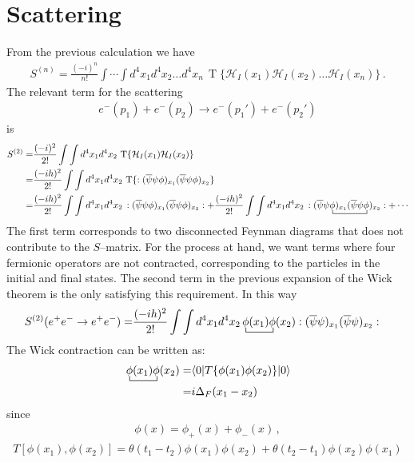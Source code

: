\section{Scattering}
\label{sec:scattering}
From the previous calculation we have
\begin{align}
S^{(n)}=  \frac{(-i)^n}{n!}\int\cdots\int d^4x_1 d^4x_2\ldots d^4x_n\,\operatorname{T}\{\mathcal{H}_I(x_1)\mathcal{H}_I(x_2)\ldots\mathcal{H}_I(x_n)\}\,.
\end{align}
The relevant term for the scattering
\begin{align}
  e^{-}(p_1)+e^{-}(p_2)\to   e^{-}(p_1')+e^{-}(p_2')
\end{align}
is
\begin{align}
S^{(2)}=&  \frac{(-i)^2}{2!}\int\int d^4x_1 d^4x_2\,\operatorname{T}\{\mathcal{H}_I(x_1)\mathcal{H}_I(x_2)\}\nonumber\\
=&  \frac{(-ih)^2}{2!}\int\int d^4x_1 d^4x_2\,\operatorname{T}\{:(\overline{\psi}\psi\phi)_{x_1}(\overline{\psi}\psi\phi)_{x_2}\}\nonumber\\
=& 
 \frac{(-ih)^2}{2!}\int\int d^4x_1 d^4x_2\,:(\overline{\psi}\psi\phi)_{x_1}(\overline{\psi}\psi\phi
)_{x_2}:+
 \frac{(-ih)^2}{2!}\int\int d^4x_1 d^4x_2\,:(\overline{\psi}
\bcontraction{\psi}{\phi}{)_{x_1}(\overline{\psi}\psi}{\phi}
\psi\phi)_{x_1}(\overline{\psi}\psi\phi
)_{x_2}:+\cdots
\end{align}
The first term corresponds to two  disconnected Feynman diagrams that does not contribute to the $S$--matrix. For the process at hand, we want terms where four fermionic operators are not contracted, corresponding to the particles in the initial and final states. The second term in the previous expansion of the Wick theorem is the only satisfying this requirement. In this way
\begin{align}
  S^{(2)}(e^+ e^-\to e^+e^-)=&\frac{(-ih)^2}{2!}\int\int d^4x_1 d^4x_2
\bcontraction{\,}{\phi}{(x_1)}{\phi}
\,\phi(x_1)\phi(x_2):(\overline{\psi}\psi)_{x_1}(\overline{\psi}\psi)_{x_2}:
\end{align}
The Wick contraction can be written as:
\begin{align}
\label{eq:77f}
  \bcontraction{\,}{\phi}{(x_1)}{\phi}
\,\phi(x_1)\phi(x_2)=&\langle0|T\{\phi(x_1)\phi(x_2)\}|0\rangle\nonumber\\
=&i\Delta_F(x_1-x_2)
\end{align}
since
\begin{align}
  \phi(x)=\phi_+(x)+\phi_-(x)\,,
\end{align}
\begin{align}
T\left[\phi(x_1),\phi(x_2)\right]=\theta(t_1-t_2)\phi(x_1)\phi(x_2)+\theta(t_2-t_1)\phi(x_2)\phi(x_1)
\end{align}
